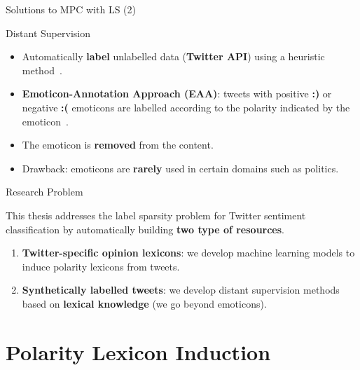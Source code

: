 \documentclass[handout]{beamer}
\begin{document}
\begin{frame}{Solutions to MPC with LS (2)}
\begin{scriptsize}
\begin{block}{Distant Supervision}
  \begin{itemize}
   \item Automatically \textbf{label} unlabelled data (\textbf{Twitter API}) using a heuristic method~\cite{Mintz2009}.
   \item \textbf{Emoticon-Annotation Approach (EAA)}: tweets with positive \textcolor[rgb]{0.00,0.00,1.00}{\textbf{:)}} or negative \textcolor[rgb]{1.00,0.00,0.00}{\textbf{:(}} emoticons are labelled according to the polarity indicated by the emoticon~\cite{Read2005}.
  \item The emoticon is \textbf{removed} from the content.
\item Drawback: emoticons are \textbf{rarely} used in certain domains such as politics. 
    \end{itemize} 


    
\end{block}
\end{scriptsize}

\end{frame}





\begin{frame}{Research Problem}

This thesis addresses the label sparsity problem for Twitter sentiment classification by automatically building \textbf{two type of resources}. 
\begin{enumerate}
 \item \textbf{Twitter-specific opinion lexicons}: we develop machine learning models to induce polarity lexicons from tweets. 
 \item  \textbf{Synthetically labelled tweets}: we develop distant supervision methods based on \textbf{lexical knowledge} (we go beyond emoticons). 
 \end{enumerate}

\end{frame}


\section{Polarity Lexicon Induction}
\end{document}
